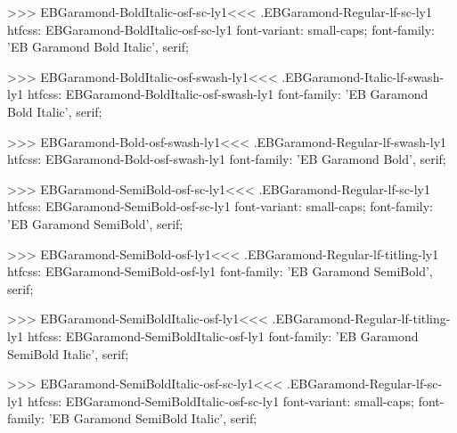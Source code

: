 {{>>>
\<EBGaramond-BoldItalic-osf-sc-ly1\><<<
.EBGaramond-Regular-lf-sc-ly1
htfcss:  EBGaramond-BoldItalic-osf-sc-ly1  font-variant: small-caps; font-family: 'EB Garamond Bold Italic', serif;

>>>
\<EBGaramond-BoldItalic-osf-swash-ly1\><<<
.EBGaramond-Italic-lf-swash-ly1
htfcss:  EBGaramond-BoldItalic-osf-swash-ly1  font-family: 'EB Garamond Bold Italic', serif;

>>>
\<EBGaramond-Bold-osf-swash-ly1\><<<
.EBGaramond-Regular-lf-swash-ly1
htfcss:  EBGaramond-Bold-osf-swash-ly1  font-family: 'EB Garamond Bold', serif;

>>>
\<EBGaramond-SemiBold-osf-sc-ly1\><<<
.EBGaramond-Regular-lf-sc-ly1
htfcss:  EBGaramond-SemiBold-osf-sc-ly1  font-variant: small-caps; font-family: 'EB Garamond SemiBold', serif;

>>>
\<EBGaramond-SemiBold-osf-ly1\><<<
.EBGaramond-Regular-lf-titling-ly1
htfcss:  EBGaramond-SemiBold-osf-ly1  font-family: 'EB Garamond SemiBold', serif;

>>>
\<EBGaramond-SemiBoldItalic-osf-ly1\><<<
.EBGaramond-Regular-lf-titling-ly1
htfcss:  EBGaramond-SemiBoldItalic-osf-ly1  font-family: 'EB Garamond SemiBold Italic', serif;

>>>
\<EBGaramond-SemiBoldItalic-osf-sc-ly1\><<<
.EBGaramond-Regular-lf-sc-ly1
htfcss:  EBGaramond-SemiBoldItalic-osf-sc-ly1  font-variant: small-caps; font-family: 'EB Garamond SemiBold Italic', serif;

}}
